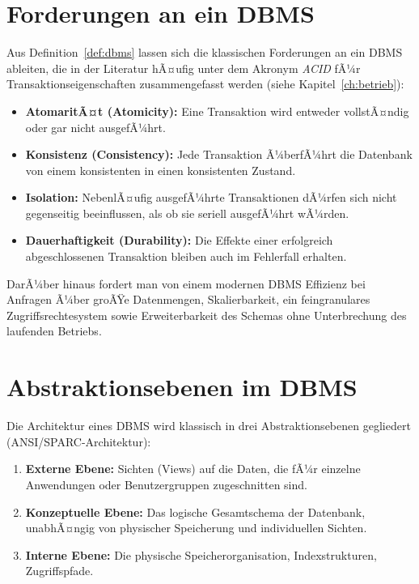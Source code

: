 ﻿\documentclass[a4paper,12pt]{report}
\theoremstyle{definition}
\theoremstyle{remark}
\begin{document}
\section{Forderungen an ein DBMS}

Aus Definition~\ref{def:dbms} lassen sich die klassischen Forderungen an
ein DBMS ableiten, die in der Literatur hÃ¤ufig unter dem Akronym
\emph{ACID} fÃ¼r Transaktionseigenschaften zusammengefasst werden
(siehe Kapitel~\ref{ch:betrieb}):

\begin{itemize}
  \item \textbf{AtomaritÃ¤t (Atomicity):} Eine Transaktion wird entweder
    vollstÃ¤ndig oder gar nicht ausgefÃ¼hrt.
  \item \textbf{Konsistenz (Consistency):} Jede Transaktion Ã¼berfÃ¼hrt
    die Datenbank von einem konsistenten in einen konsistenten Zustand.
  \item \textbf{Isolation:} NebenlÃ¤ufig ausgefÃ¼hrte Transaktionen
    dÃ¼rfen sich nicht gegenseitig beeinflussen, als ob sie seriell
    ausgefÃ¼hrt wÃ¼rden.
  \item \textbf{Dauerhaftigkeit (Durability):} Die Effekte einer
    erfolgreich abgeschlossenen Transaktion bleiben auch im Fehlerfall
    erhalten.
\end{itemize}

DarÃ¼ber hinaus fordert man von einem modernen DBMS Effizienz bei
Anfragen Ã¼ber groÃŸe Datenmengen, Skalierbarkeit, ein feingranulares
Zugriffsrechtesystem sowie Erweiterbarkeit des Schemas ohne
Unterbrechung des laufenden Betriebs.

\section{Abstraktionsebenen im DBMS}

Die Architektur eines DBMS wird klassisch in drei Abstraktionsebenen
gegliedert (ANSI/SPARC-Architektur):

\begin{enumerate}
  \item \textbf{Externe Ebene:} Sichten (Views) auf die Daten, die fÃ¼r
    einzelne Anwendungen oder Benutzergruppen zugeschnitten sind.
  \item \textbf{Konzeptuelle Ebene:} Das logische Gesamtschema der
    Datenbank, unabhÃ¤ngig von physischer Speicherung und individuellen
    Sichten.
  \item \textbf{Interne Ebene:} Die physische Speicherorganisation,
    Indexstrukturen, Zugriffspfade.
\end{enumerate}
\end{document}
